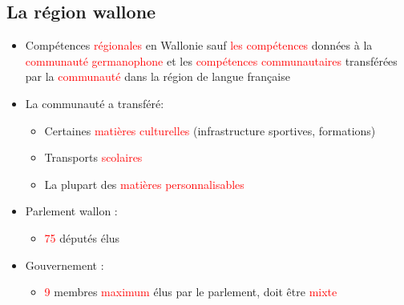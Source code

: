 \subsection{La région wallone}
\begin{itemize}
	\item Compétences \textcolor{red}{régionales} en Wallonie sauf \textcolor{red}{les compétences} données à la \textcolor{red}{communauté germanophone} et les \textcolor{red}{compétences communautaires} transférées par la \textcolor{red}{communauté} dans la région de langue française
	\item La communauté a transféré:
	\begin{itemize}
		\item Certaines \textcolor{red}{matières culturelles} (infrastructure sportives, formations)
		\item Transports \textcolor{red}{scolaires}
		\item La plupart des \textcolor{red}{matières personnalisables}
	\end{itemize}
	\item Parlement wallon :
	\begin{itemize}
		\item \textcolor{red}{75} députés élus
	\end{itemize}
	\item Gouvernement :
	\begin{itemize}
		\item \textcolor{red}{9} membres \textcolor{red}{maximum} élus par le parlement, doit être \textcolor{red}{mixte}
	\end{itemize}
\end{itemize}

